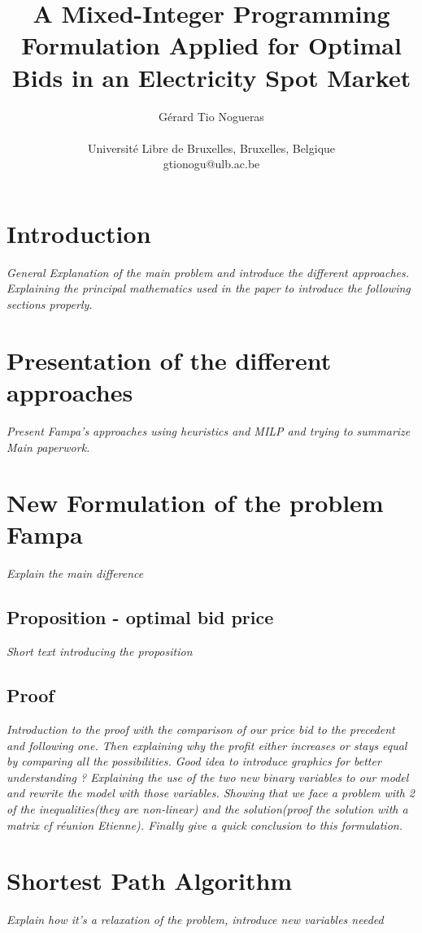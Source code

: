 \documentclass[a4paper,11pt]{article}
\title{A Mixed-Integer Programming Formulation Applied for Optimal Bids in an Electricity Spot Market}
\author{Gérard Tio Nogueras \\
\mbox{}\\
Université Libre de Bruxelles, Bruxelles, Belgique \\
gtionogu@ulb.ac.be}
\begin{document}
\maketitle
\newpage

\begin{abstract}
\end{abstract}

\newpage

\section{Introduction}
\textit{General Explanation of the main problem and introduce the different approaches.
Explaining the principal mathematics used in the paper to introduce the following sections properly.}

\section{Presentation of the different approaches}
\textit{Present Fampa's approaches using heuristics and MILP and trying to summarize Main paperwork.}

\section{New Formulation of the problem Fampa}
\textit{Explain the main difference}
\subsection{Proposition - optimal bid price}
\textit{Short text introducing the proposition} 
\subsection{Proof}
\textit{Introduction to the proof with the comparison of our price bid to the precedent and following one. Then explaining why the profit either increases or stays equal by comparing all the possibilities. Good idea to introduce graphics for better understanding ? Explaining the use of the two new binary variables to our model and rewrite the model with those variables. Showing that we face a problem with 2 of the inequalities(they are non-linear) and the solution(proof the solution with a matrix cf réunion Etienne). Finally give a quick conclusion to this formulation.}

\section{Shortest Path Algorithm}
\textit{Explain how it's a relaxation of the problem, introduce new variables needed}
\end{document}
